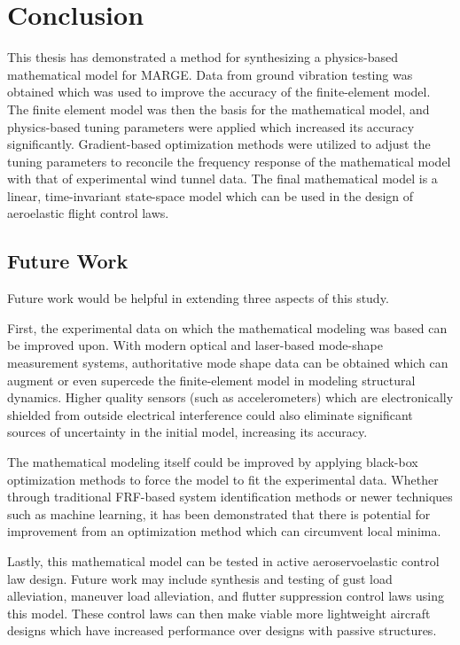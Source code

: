 \chapter{Conclusion}
\label{ch:conclusion}

This thesis has demonstrated a method for synthesizing a physics-based mathematical model for MARGE. Data from ground vibration testing was obtained which was used to improve the accuracy of the finite-element model. The finite element model was then the basis for the mathematical model, and physics-based tuning parameters were applied which increased its accuracy significantly. Gradient-based optimization methods were utilized to adjust the tuning parameters to reconcile the frequency response of the mathematical model with that of experimental wind tunnel data. The final mathematical model is a linear, time-invariant state-space model which can be used in the design of aeroelastic flight control laws.

\section{Future Work}

Future work would be helpful in extending three aspects of this study.

First, the experimental data on which the mathematical modeling was based can be improved upon. With modern optical and laser-based mode-shape measurement systems, authoritative mode shape data can be obtained which can augment or even supercede the finite-element model in modeling structural dynamics. Higher quality sensors (such as accelerometers) which are electronically shielded from outside electrical interference could also eliminate significant sources of uncertainty in the initial model, increasing its accuracy.

The mathematical modeling itself could be improved by applying black-box optimization methods to force the model to fit the experimental data. Whether through traditional FRF-based system identification methods or newer techniques such as machine learning, it has been demonstrated that there is potential for improvement from an optimization method which can circumvent local minima.

Lastly, this mathematical model can be tested in active aeroservoelastic control law design. Future work may include synthesis and testing of gust load alleviation, maneuver load alleviation, and flutter suppression control laws using this model. These control laws can then make viable more lightweight aircraft designs which have increased performance over designs with passive structures.
